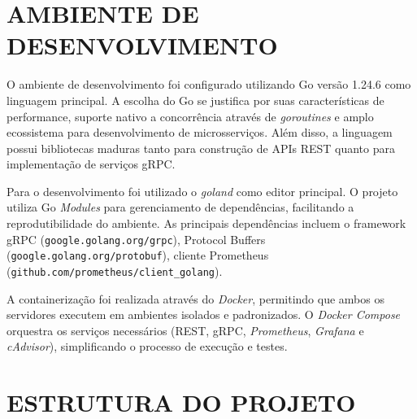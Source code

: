 

\section{AMBIENTE DE DESENVOLVIMENTO}\label{sec:ambiente}

O ambiente de desenvolvimento foi configurado utilizando Go versão 1.24.6 como linguagem principal. A escolha do Go se justifica por suas características de performance, suporte nativo a concorrência através de \textit{goroutines} e amplo ecossistema para desenvolvimento de microsserviços. Além disso, a linguagem possui bibliotecas maduras tanto para construção de APIs REST quanto para implementação de serviços gRPC.

Para o desenvolvimento foi utilizado o \textit{goland} como editor principal. O projeto utiliza Go \textit{Modules} para gerenciamento de dependências, facilitando a reprodutibilidade do ambiente. As principais dependências incluem o framework gRPC (\texttt{google.golang.org/grpc}), Protocol Buffers (\texttt{google.golang.org/protobuf}), cliente Prometheus (\texttt{github.com/prometheus/client\_golang}).

A containerização foi realizada através do \textit{Docker}, permitindo que ambos os servidores executem em ambientes isolados e padronizados. O \textit{Docker Compose} orquestra os serviços necessários (REST, gRPC, \textit{Prometheus}, \textit{Grafana} e \textit{cAdvisor}), simplificando o processo de execução e testes.


\section{ESTRUTURA DO PROJETO}\label{sec:estrutura}

